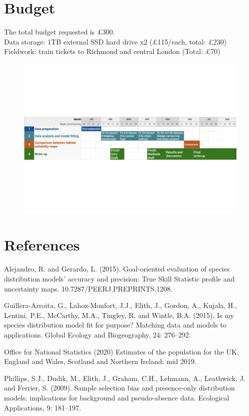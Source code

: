 \documentclass[11pt, a4paper]{article}
\begin{document}
\section{Budget}
The total budget requested is £300.\\
Data storage: 1TB external SSD hard drive x2 (£115/each, total: £230)\\
Fieldwork: train tickets to Richmond and central London (Total: £70)


\begin{figure}[H]
  \includegraphics[width=\textwidth]{Gnatt_timeline.pdf}
\end{figure}

\newpage
\section{References}
Alejandro, R. and Gerardo, L. (2015). Goal-oriented evaluation of species distribution models’ accuracy and precision: True Skill Statistic profile and uncertainty maps. 10.7287/PEERJ.PREPRINTS.1208. 

Guillera-Arroita, G., Lahoz-Monfort, J.J., Elith, J., Gordon, A., Kujala, H., Lentini, P.E., McCarthy, M.A., Tingley, R. and Wintle, B.A. (2015). Is my species distribution model fit for purpose? Matching data and models to applications. Global Ecology and Biogeography, 24: 276–292.

Office for National Statistics (2020) Estimates of the population for the UK, England and Wales, Scotland and Northern Ireland: mid 2019.

Phillips, S.J., Dudik, M., Elith, J., Graham, C.H., Lehmann, A., Leathwick, J. and Ferrier, S. (2009). Sample selection bias and presence-only distribution models: implications for background and pseudo-absence data. Ecological Applications, 9: 181–197.
\end{document}
